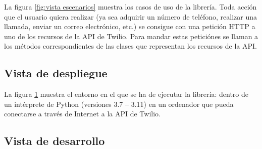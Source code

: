 \documentclass{article}
\begin{document}
\hfill

La figura \ref{fig:vista escenarios}
muestra los casos de uso de la librería.
Toda acción que el usuario quiera realizar
(ya sea adquirir un número de teléfono,
realizar una llamada,
enviar un correo electrónico, etc.)
se consigue con una petición HTTP
a uno de los recursos de la API de Twilio.
Para mandar estas peticiónes
se llaman a los métodos correspondientes
de las clases que representan los recursos de la API.

\subsection{Vista de despliegue}

\hfill

\begin{figure}[H]
\label{fig:vista de despliegue}
\end{figure}

\hfill

La figura \ref{fig:vista de despliegue}
muestra el entorno en el que se ha de ejecutar la librería:
dentro de un intérprete de Python (versiones 3.7 -- 3.11)
en un ordenador que pueda conectarse a través de Internet
a la API de Twilio.

\subsection{Vista de desarrollo}
\end{document}
